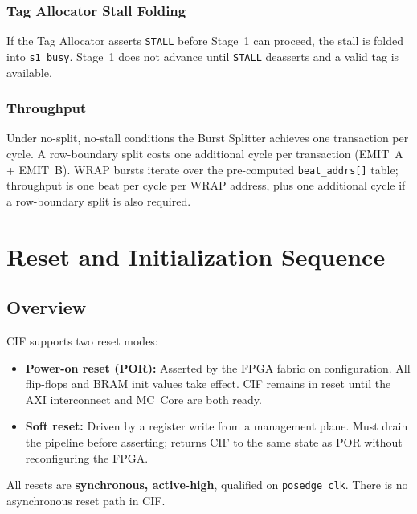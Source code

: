 \subsubsection*{Tag Allocator Stall Folding}

If the Tag Allocator asserts \texttt{STALL} before Stage~1 can proceed, the
stall is folded into \texttt{s1\_busy}. Stage~1 does not advance until
\texttt{STALL} deasserts and a valid tag is available.

\subsubsection*{Throughput}

Under no-split, no-stall conditions the Burst Splitter achieves one
transaction per cycle. A row-boundary split costs one additional cycle per
transaction (EMIT~A + EMIT~B). WRAP bursts iterate over the pre-computed
\texttt{beat\_addrs[]} table; throughput is one beat per cycle per WRAP
address, plus one additional cycle if a row-boundary split is also required.

\newpage
\section{Reset and Initialization Sequence}

\subsection{Overview}

CIF supports two reset modes:

\begin{itemize}
  \item \textbf{Power-on reset (POR):} Asserted by the FPGA fabric on
        configuration. All flip-flops and BRAM init values take effect. CIF
        remains in reset until the AXI interconnect and MC~Core are both ready.
  \item \textbf{Soft reset:} Driven by a register write from a management
        plane. Must drain the pipeline before asserting; returns CIF to the same
        state as POR without reconfiguring the FPGA.
\end{itemize}

All resets are \textbf{synchronous, active-high}, qualified on
\texttt{posedge clk}. There is no asynchronous reset path in CIF.

